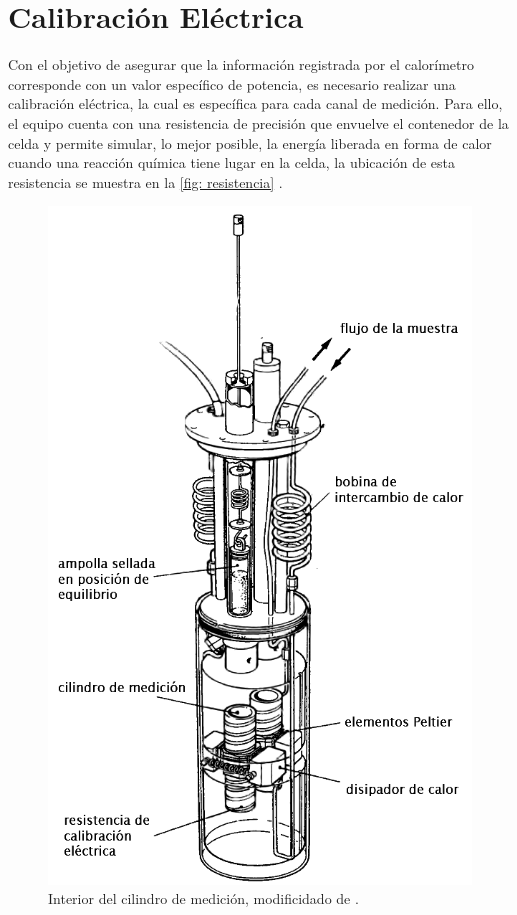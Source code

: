 
%




\chapter{Calibración Eléctrica}\label{sec: electrica}
	Con el objetivo de asegurar que la información registrada por el calorímetro corresponde con un valor específico de potencia, es necesario realizar una calibración eléctrica, la cual es específica para cada canal de medición. Para ello, el equipo cuenta con una resistencia de precisión que envuelve el contenedor de la celda y permite simular, lo mejor posible, la energía liberada en forma de calor cuando una reacción química tiene lugar en la celda, la ubicación de esta resistencia se muestra en la \autoref{fig: resistencia} \cite{Suurkuusk}. 
	\begin{figure}[h]
		\centering
		\includegraphics[width=0.45\linewidth]{Figures/resistencia}
		\caption{Interior del cilindro de medición, modificidado de \cite{Suurkuusk}.}
		\label{fig: resistencia}
	\end{figure}
	
